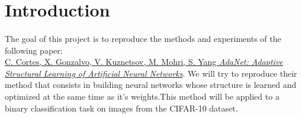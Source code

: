\documentclass[11 pt]{article}
\begin{document}

\section*{Introduction}
\paragraph{}The goal of this project is to reproduce the methods and experiments of the following paper:\\
\href{https://arxiv.org/pdf/1607.01097.pdf}{C. Cortes, X. Gonzalvo, V. Kuznetsov, M. Mohri, S. Yang \emph{AdaNet: Adaptive Structural Learning of Artificial Neural Networks}}.
We will try to reproduce their method that consists in building neural networks whose structure is learned and optimized at the same time as it's weights.This method will be applied to a binary classification task on images from the CIFAR-10 dataset.

\end{document}
